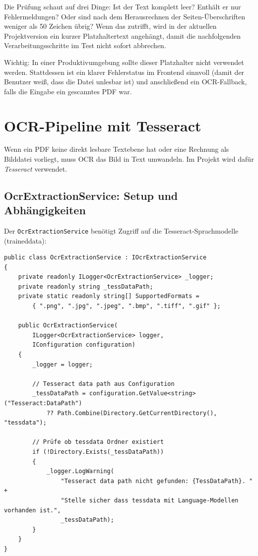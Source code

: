 Die Prüfung schaut auf drei Dinge: Ist der Text komplett leer? Enthält er nur Fehlermeldungen? Oder sind nach dem Herausrechnen der Seiten-Überschriften weniger als 50 Zeichen übrig? Wenn das zutrifft, wird in der aktuellen Projektversion ein kurzer Platzhaltertext angehängt, damit die nachfolgenden Verarbeitungsschritte im Test nicht sofort abbrechen.

Wichtig: In einer Produktivumgebung sollte dieser Platzhalter nicht verwendet werden. Stattdessen ist ein klarer Fehlerstatus im Frontend sinnvoll (damit der Benutzer weiß, dass die Datei unlesbar ist) und anschließend ein OCR-Fallback, falls die Eingabe ein gescanntes PDF war.

\section{OCR-Pipeline mit Tesseract}
\label{sec:ocr_implementation}

Wenn ein PDF keine direkt lesbare Textebene hat oder eine Rechnung als Bilddatei vorliegt, muss OCR das Bild in Text umwandeln. Im Projekt wird dafür \textit{Tesseract} verwendet.

\subsection{OcrExtractionService: Setup und Abhängigkeiten}
\label{subsec:ocr_service_setup}

Der \texttt{OcrExtractionService} benötigt Zugriff auf die Tesseract-Sprachmodelle (traineddata):

\begin{lstlisting}[language={[Sharp]C}, caption={OcrExtractionService Constructor}, label={lst:ocr_constructor}]
public class OcrExtractionService : IOcrExtractionService
{
    private readonly ILogger<OcrExtractionService> _logger;
    private readonly string _tessDataPath;
    private static readonly string[] SupportedFormats = 
        { ".png", ".jpg", ".jpeg", ".bmp", ".tiff", ".gif" };

    public OcrExtractionService(
        ILogger<OcrExtractionService> logger, 
        IConfiguration configuration)
    {
        _logger = logger;
        
        // Tesseract data path aus Configuration
        _tessDataPath = configuration.GetValue<string>("Tesseract:DataPath") 
            ?? Path.Combine(Directory.GetCurrentDirectory(), "tessdata");
        
        // Prüfe ob tessdata Ordner existiert
        if (!Directory.Exists(_tessDataPath))
        {
            _logger.LogWarning(
                "Tesseract data path nicht gefunden: {TessDataPath}. " +
                "Stelle sicher dass tessdata mit Language-Modellen vorhanden ist.", 
                _tessDataPath);
        }
    }
}
\end{lstlisting}

